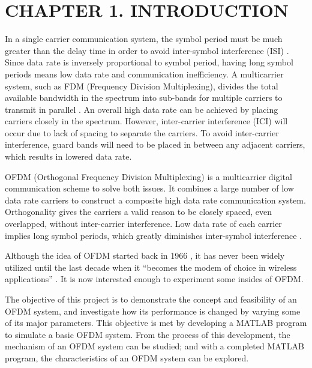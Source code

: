 \section*{CHAPTER 1. INTRODUCTION}
\setcounter{section}{1}
\setcounter{subsection}{0}
\setcounter{figure}{0}
\setcounter{table}{0}

In a single carrier communication system, the symbol period must be much  greater than the delay time in order to avoid inter-symbol interference (ISI) \cite{b1}. Since data rate is inversely proportional to symbol period, having long symbol periods means low data rate and communication inefficiency. A multicarrier system, such as FDM (Frequency Division Multiplexing), divides the total available bandwidth in the spectrum into sub-bands for multiple carriers to transmit in parallel \cite{b2}. An overall high data rate can be achieved by placing carriers closely in the spectrum. However, inter-carrier interference (ICI) will occur due to lack of spacing to separate the carriers. To avoid inter-carrier interference, guard bands will need to be placed in between any adjacent carriers, which results in lowered data rate.

OFDM (Orthogonal Frequency Division Multiplexing) is a multicarrier digital communication scheme to solve both issues. It combines a large number of low data rate carriers to construct a composite high data rate communication system. Orthogonality gives the carriers a valid reason to be closely spaced, even overlapped, without inter-carrier interference. Low data rate of each carrier implies long symbol periods, which greatly diminishes inter-symbol interference \cite{b3}.

Although the idea of OFDM started back in 1966 \cite{b4}, it has never been widely utilized until the last decade when it “becomes the modem of choice in wireless applications” \cite{b5}. It is now interested enough to experiment some insides of OFDM.

The objective of this project is to demonstrate the concept and feasibility of an OFDM system, and investigate how its performance is changed by varying some of its major parameters. This objective is met by developing a MATLAB program to simulate a basic OFDM system. From the process of this development, the mechanism of an OFDM system can be studied; and with a completed MATLAB program, the characteristics of an OFDM system can be explored.